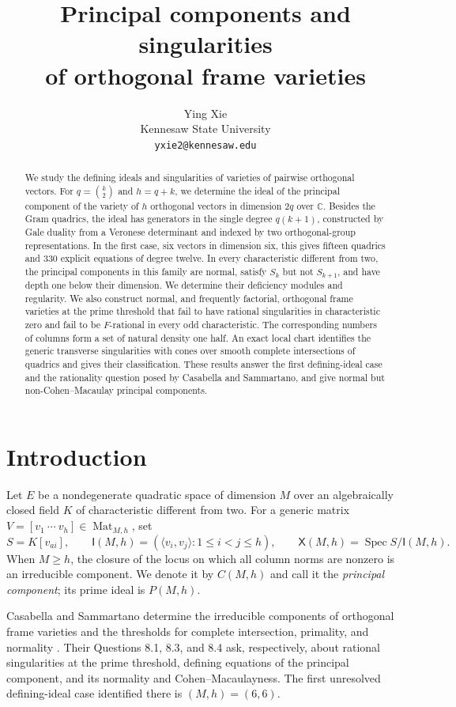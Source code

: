 \documentclass[11pt]{article}
\title{Principal components and singularities\\of orthogonal frame varieties}
\author{Ying Xie\\[3pt]\small Kennesaw State University\\
\small\texttt{yxie2@kennesaw.edu}}
\date{}
\theoremstyle{definition}
\theoremstyle{remark}
\numberwithin{equation}{section}
\DeclareMathOperator{\Mat}{Mat}
\DeclareMathOperator{\Spec}{Spec}
\newcommand{\CC}{\mathbb C}
\newcommand{\XX}{\mathsf X}
\newcommand{\II}{\mathsf I}
\begin{document}
\maketitle

\begin{abstract}
We study the defining ideals and singularities of varieties of pairwise
orthogonal vectors. For $q=\binom{k}{2}$ and $h=q+k$, we determine the
ideal of the principal component of the variety of $h$ orthogonal vectors
in dimension $2q$ over $\CC$. Besides the Gram quadrics, the ideal has
generators in the single degree $q(k+1)$, constructed by Gale duality
from a Veronese determinant and indexed by two orthogonal-group
representations. In the first case, six vectors in dimension six, this
gives fifteen quadrics and $330$ explicit equations of degree twelve.
In every characteristic different from two, the principal components
in this family are normal, satisfy $S_k$ but not $S_{k+1}$, and have
depth one below their dimension. We determine their deficiency modules
and regularity. We also construct normal, and frequently factorial,
orthogonal frame varieties at the prime threshold that fail to have
rational singularities in characteristic zero and fail to be $F$-rational
in every odd characteristic. The corresponding numbers of columns form
a set of natural density one half. An exact local chart identifies the
generic transverse singularities with cones over smooth complete
intersections of quadrics and gives their classification. These results
answer the first defining-ideal case and the rationality question posed
by Casabella and Sammartano, and give normal but non-Cohen--Macaulay
principal components.
\end{abstract}

\section{Introduction}

Let $E$ be a nondegenerate quadratic space of dimension $M$ over an
algebraically closed field $K$ of characteristic different from two.
For a generic matrix $V=[v_1\ \cdots\ v_h]\in\Mat_{M,h}$, set
\[
 S=K[v_{ai}],\qquad
 \II(M,h)=(\langle v_i,v_j\rangle:1\leq i<j\leq h),\qquad
 \XX(M,h)=\Spec S/\II(M,h).
\]
When $M\geq h$, the closure of the locus on which all column norms are
nonzero is an irreducible component. We denote it by $C(M,h)$ and call
it the \emph{principal component}; its prime ideal is $P(M,h)$.

Casabella and Sammartano determine the irreducible components of
orthogonal frame varieties and the thresholds for complete intersection,
primality, and normality \cite{CS}. Their Questions 8.1, 8.3, and 8.4 ask,
respectively, about rational singularities at the prime threshold,
defining equations of the principal component, and its normality and
Cohen--Macaulayness. The first unresolved defining-ideal case identified
there is $(M,h)=(6,6)$.
\end{document}

